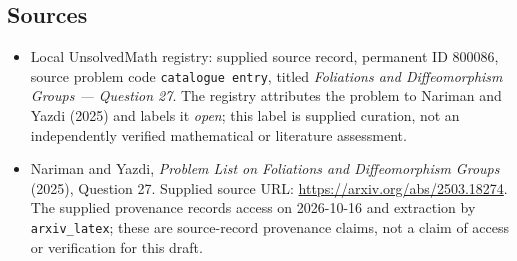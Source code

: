 \documentclass[11pt]{article}
\begin{document}
\subsection{Sources}
\begin{itemize}
\item Local UnsolvedMath registry: supplied source record, permanent ID \(800086\), source problem code \texttt{catalogue entry}, titled \emph{Foliations and Diffeomorphism Groups --- Question 27}. The registry attributes the problem to Nariman and Yazdi (2025) and labels it \emph{open}; this label is supplied curation, not an independently verified mathematical or literature assessment.
\item Nariman and Yazdi, \emph{Problem List on Foliations and Diffeomorphism Groups} (2025), Question 27. Supplied source URL: \url{https://arxiv.org/abs/2503.18274}. The supplied provenance records access on 2026-10-16 and extraction by \texttt{arxiv\_latex}; these are source-record provenance claims, not a claim of access or verification for this draft.
\end{itemize}
\end{document}
